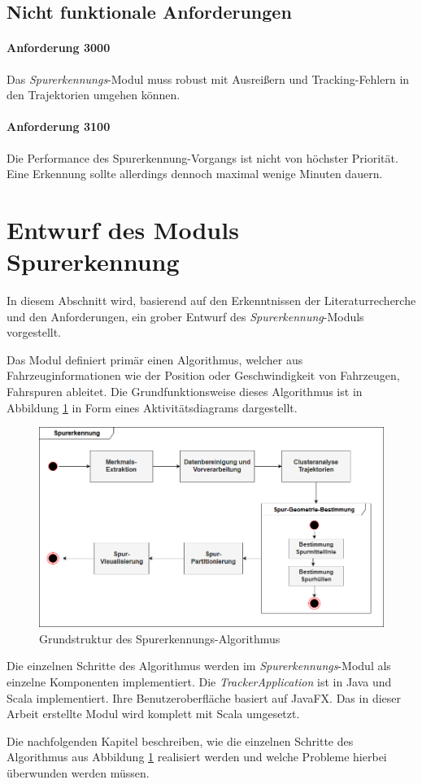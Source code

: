 \subsection{Nicht funktionale Anforderungen}

\paragraph{Anforderung 3000}
Das \textit{Spurerkennungs}-Modul muss robust mit Ausreißern und Tracking-Fehlern in den Trajektorien umgehen können.

\paragraph{Anforderung 3100}
Die Performance des Spurerkennung-Vorgangs ist nicht von höchster Priorität. Eine Erkennung sollte allerdings
dennoch maximal wenige Minuten dauern.


\section{Entwurf des Moduls Spurerkennung}
\label{sec:design}

In diesem Abschnitt wird, basierend auf den Erkenntnissen der Literaturrecherche und den Anforderungen,
ein grober Entwurf des \textit{Spurerkennung}-Moduls vorgestellt.

Das Modul definiert primär einen Algorithmus, welcher aus Fahrzeuginformationen wie der Position
oder Geschwindigkeit von Fahrzeugen, Fahrspuren ableitet. Die Grundfunktionsweise dieses Algorithmus
ist in Abbildung \ref{fig:concept_laneDetection_activity} in Form eines Aktivitätsdiagrams dargestellt.

\begin{figure}[H]
    \centering
    \includegraphics[width=0.8\linewidth]{../resources/img/konzeption/activity_laneDetection}
    \caption{Grundstruktur des Spurerkennungs-Algorithmus}
    \label{fig:concept_laneDetection_activity}
\end{figure}

Die einzelnen Schritte des Algorithmus werden im \textit{Spurerkennungs}-Modul als einzelne Komponenten
implementiert.
Die \textit{TrackerApplication} ist in Java und Scala implementiert. Ihre Benutzeroberfläche basiert
auf JavaFX. Das in dieser Arbeit erstellte Modul wird komplett mit Scala umgesetzt.

Die nachfolgenden Kapitel beschreiben, wie die einzelnen Schritte des Algorithmus aus
Abbildung \ref{fig:concept_laneDetection_activity} realisiert werden und welche Probleme hierbei
überwunden werden müssen.